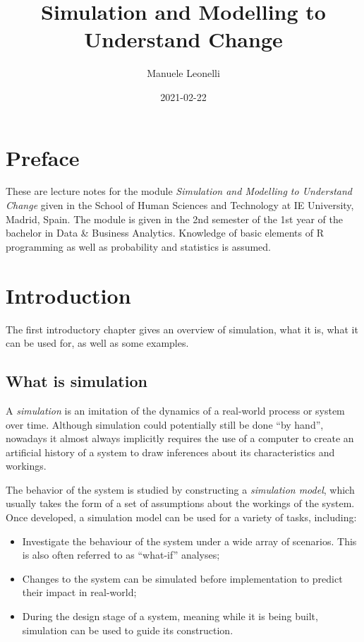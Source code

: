 \documentclass[
]{book}
\title{Simulation and Modelling to Understand Change}
\author{Manuele Leonelli}
\date{2021-02-22}
\begin{document}
\maketitle

{
\setcounter{tocdepth}{1}
\tableofcontents
}
\hypertarget{preface}{%
\chapter*{Preface}\label{preface}}

These are lecture notes for the module \emph{Simulation and Modelling to Understand Change} given in the School of Human Sciences and Technology at IE University, Madrid, Spain. The module is given in the 2nd semester of the 1st year of the bachelor in Data \& Business Analytics. Knowledge of basic elements of R programming as well as probability and statistics is assumed.

\hypertarget{intro}{%
\chapter{Introduction}\label{intro}}

The first introductory chapter gives an overview of simulation, what it is, what it can be used for, as well as some examples.

\hypertarget{what-is-simulation}{%
\section{What is simulation}\label{what-is-simulation}}

A \emph{simulation} is an imitation of the dynamics of a real-world process or system over time. Although simulation could potentially still be done ``by hand'', nowadays it almost always implicitly requires the use of a computer to create an artificial history of a system to draw inferences about its characteristics and workings.

The behavior of the system is studied by constructing a \emph{simulation model}, which usually takes the form of a set of assumptions about the workings of the system. Once developed, a simulation model can be used for a variety of tasks, including:

\begin{itemize}
\item
  Investigate the behaviour of the system under a wide array of scenarios. This is also often referred to as ``what-if'' analyses;
\item
  Changes to the system can be simulated before implementation to predict their impact in real-world;
\item
  During the design stage of a system, meaning while it is being built, simulation can be used to guide its construction.
\end{itemize}
\end{document}
